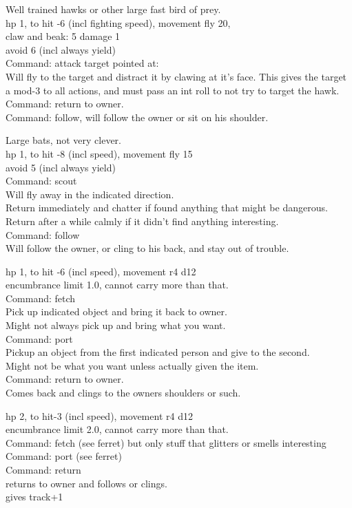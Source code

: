 Well trained hawks or other large fast bird of prey. \\
hp 1, to hit -6 (incl fighting speed), movement fly 20, \\
claw and beak: 5 damage 1 \\
avoid  6 (incl always yield) \\
Command: attack target pointed at: \\
Will fly to the target and distract it by clawing at it's face. This gives the target a mod-3 to all actions, and must pass an int roll to not try to target the hawk. \\
Command: return to owner. \\
Command: follow, will follow the owner or sit on his shoulder.


Large bats, not very clever. \\
hp 1, to hit -8 (incl speed), movement fly 15 \\
avoid 5 (incl always yield) \\
Command: scout \\
Will fly away in the indicated direction. \\
Return immediately and chatter if found anything that might be dangerous. \\
Return after a while calmly if it didn't find anything interesting. \\
Command: follow \\
Will follow the owner, or cling to his back, and stay out of trouble.


hp 1, to hit -6 (incl speed), movement r4 d12 \\
encumbrance limit 1.0, cannot carry more than that. \\
Command: fetch \\
Pick up indicated object and bring it back to owner. \\
Might not always pick up and bring what you want. \\
Command: port \\
Pickup an object from the first indicated person and give to the second. \\
Might not be what you want unless actually given the item. \\
Command: return to owner. \\
Comes back and clings to the owners shoulders or such.


hp 2, to hit-3 (incl speed), movement r4 d12 \\
encumbrance limit 2.0, cannot carry more than that. \\
Command: fetch (see ferret) but only stuff that glitters or smells interesting \\
Command: port (see ferret) \\
Command: return \\
returns to owner and follows or clings. \\
gives track+1


